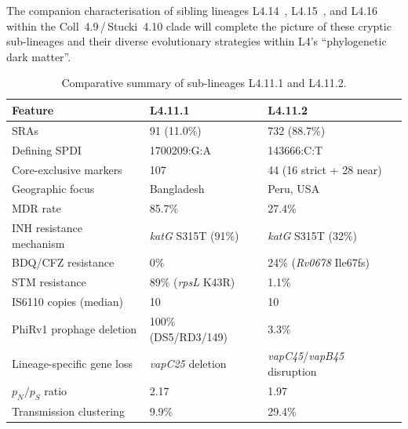 \documentclass[11pt,a4paper]{article}
\newcommand{\lignee}[1]{\textsf{#1}}
\begin{document}
The companion characterisation of sibling lineages \lignee{L4.14}~\cite{guyeuxL414},
\lignee{L4.15}~\cite{guyeuxL415}, and \lignee{L4.16} within the
Coll~4.9\,/\,Stucki~4.10 clade will complete the picture of these
cryptic sub-lineages and their diverse evolutionary strategies within
L4's ``phylogenetic dark matter''.


\begin{table}[htbp]
	\centering
	\small
	\caption{Comparative summary of sub-lineages \lignee{L4.11.1} and \lignee{L4.11.2}.}
	\label{tab:comparison}
	\begin{tabular}{lll}
		\toprule
		\textbf{Feature}           & \textbf{L4.11.1}            & \textbf{L4.11.2}                           \\
		\midrule
		SRAs                    & 91 (11.0\%)                 & 732 (88.7\%)                               \\
		Defining SPDI              & 1700209:G:A                 & 143666:C:T                                 \\
		Core-exclusive markers     & 107                         & 44 (16 strict + 28 near)                   \\
		Geographic focus           & Bangladesh                  & Peru, USA                                  \\
		MDR rate                   & 85.7\%                      & 27.4\%                                     \\
		INH resistance mechanism   & \textit{katG} S315T (91\%)  & \textit{katG} S315T (32\%)                 \\
		BDQ/CFZ resistance         & 0\%                         & 24\% (\textit{Rv0678} Ile67fs)             \\
		STM resistance             & 89\% (\textit{rpsL} K43R)   & 1.1\%                                      \\
		IS6110 copies (median)     & 10                          & 10                                         \\
		PhiRv1 prophage deletion   & 100\% (DS5/RD3/149)         & 3.3\%                                      \\
		Lineage-specific gene loss & \textit{vapC25} deletion    & \textit{vapC45}/\textit{vapB45} disruption \\
		$p_N/p_S$ ratio            & 2.17                        & 1.97                                       \\
		Transmission clustering    & 9.9\%                       & 29.4\%                                     \\
		\bottomrule
	\end{tabular}
\end{table}
\end{document}
